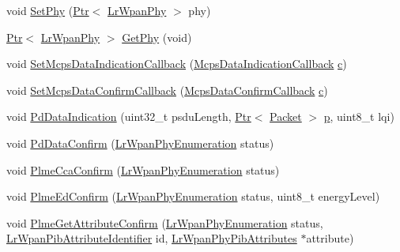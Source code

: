 \begin{DoxyCompactItemize}
\item 
void \hyperlink{classns3_1_1LrWpanMac_ad0285c082a14d9f7b2ca155fb43d7cb2}{Set\+Phy} (\hyperlink{classns3_1_1Ptr}{Ptr}$<$ \hyperlink{classns3_1_1LrWpanPhy}{Lr\+Wpan\+Phy} $>$ phy)
\item 
\hyperlink{classns3_1_1Ptr}{Ptr}$<$ \hyperlink{classns3_1_1LrWpanPhy}{Lr\+Wpan\+Phy} $>$ \hyperlink{classns3_1_1LrWpanMac_a078d33ecb114500b7f01988b4ac5d515}{Get\+Phy} (void)
\item 
void \hyperlink{classns3_1_1LrWpanMac_a40e8518d2cf88b954d1e10f589b78e2f}{Set\+Mcps\+Data\+Indication\+Callback} (\hyperlink{group__lr-wpan_ga1635d218f83c7d0107b268080efd317b}{Mcps\+Data\+Indication\+Callback} \hyperlink{mmwave_2model_2fading-traces_2fading__trace__generator_8m_ae0323a9039add2978bf5b49550572c7c}{c})
\item 
void \hyperlink{classns3_1_1LrWpanMac_a7d4650a20fe142c3a3ff60326694d893}{Set\+Mcps\+Data\+Confirm\+Callback} (\hyperlink{group__lr-wpan_ga00a61304d3d1c08a4fa8ae483f960001}{Mcps\+Data\+Confirm\+Callback} \hyperlink{mmwave_2model_2fading-traces_2fading__trace__generator_8m_ae0323a9039add2978bf5b49550572c7c}{c})
\item 
void \hyperlink{classns3_1_1LrWpanMac_a71139cc1bd26ab1c0a9c2e7791631389}{Pd\+Data\+Indication} (uint32\+\_\+t psdu\+Length, \hyperlink{classns3_1_1Ptr}{Ptr}$<$ \hyperlink{classns3_1_1Packet}{Packet} $>$ \hyperlink{lte__link__budget__x2__handover__measures_8m_ac9de518908a968428863f829398a4e62}{p}, uint8\+\_\+t lqi)
\item 
void \hyperlink{classns3_1_1LrWpanMac_ac81207dec57efdb50dc4b1132e68399f}{Pd\+Data\+Confirm} (\hyperlink{group__lr-wpan_ga6494269d13d45c511a07b7ccbb1de754}{Lr\+Wpan\+Phy\+Enumeration} status)
\item 
void \hyperlink{classns3_1_1LrWpanMac_a09ef4c443d9e6f0b1411170267ddf474}{Plme\+Cca\+Confirm} (\hyperlink{group__lr-wpan_ga6494269d13d45c511a07b7ccbb1de754}{Lr\+Wpan\+Phy\+Enumeration} status)
\item 
void \hyperlink{classns3_1_1LrWpanMac_a372f799dc789d4a24f7c6ba02c728ca3}{Plme\+Ed\+Confirm} (\hyperlink{group__lr-wpan_ga6494269d13d45c511a07b7ccbb1de754}{Lr\+Wpan\+Phy\+Enumeration} status, uint8\+\_\+t energy\+Level)
\item 
void \hyperlink{classns3_1_1LrWpanMac_a94441fcedfe8decefa629115668efb33}{Plme\+Get\+Attribute\+Confirm} (\hyperlink{group__lr-wpan_ga6494269d13d45c511a07b7ccbb1de754}{Lr\+Wpan\+Phy\+Enumeration} status, \hyperlink{group__lr-wpan_gae6da9958c1a7194ce9160d866d4164bc}{Lr\+Wpan\+Pib\+Attribute\+Identifier} id, \hyperlink{structns3_1_1LrWpanPhyPibAttributes}{Lr\+Wpan\+Phy\+Pib\+Attributes} $\ast$attribute)

\end{DoxyCompactItemize}
